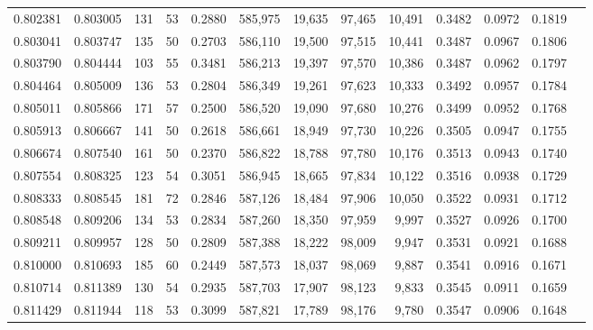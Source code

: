 \begin{tabular}{rrrrrrrrrrrrr}
0.802381 & 0.803005 &    131 &    53 &                                     0.2880 & 585,975 &  19,635 &  97,465 &  10,491 & 0.3482 & 0.0972 & 0.1819 \\
0.803041 & 0.803747 &    135 &    50 &                                     0.2703 & 586,110 &  19,500 &  97,515 &  10,441 & 0.3487 & 0.0967 & 0.1806 \\
0.803790 & 0.804444 &    103 &    55 &                                     0.3481 & 586,213 &  19,397 &  97,570 &  10,386 & 0.3487 & 0.0962 & 0.1797 \\
0.804464 & 0.805009 &    136 &    53 &                                     0.2804 & 586,349 &  19,261 &  97,623 &  10,333 & 0.3492 & 0.0957 & 0.1784 \\
0.805011 & 0.805866 &    171 &    57 &                                     0.2500 & 586,520 &  19,090 &  97,680 &  10,276 & 0.3499 & 0.0952 & 0.1768 \\
0.805913 & 0.806667 &    141 &    50 &                                     0.2618 & 586,661 &  18,949 &  97,730 &  10,226 & 0.3505 & 0.0947 & 0.1755 \\
0.806674 & 0.807540 &    161 &    50 &                                     0.2370 & 586,822 &  18,788 &  97,780 &  10,176 & 0.3513 & 0.0943 & 0.1740 \\
0.807554 & 0.808325 &    123 &    54 &                                     0.3051 & 586,945 &  18,665 &  97,834 &  10,122 & 0.3516 & 0.0938 & 0.1729 \\
0.808333 & 0.808545 &    181 &    72 &                                     0.2846 & 587,126 &  18,484 &  97,906 &  10,050 & 0.3522 & 0.0931 & 0.1712 \\
0.808548 & 0.809206 &    134 &    53 &                                     0.2834 & 587,260 &  18,350 &  97,959 &   9,997 & 0.3527 & 0.0926 & 0.1700 \\
0.809211 & 0.809957 &    128 &    50 &                                     0.2809 & 587,388 &  18,222 &  98,009 &   9,947 & 0.3531 & 0.0921 & 0.1688 \\
0.810000 & 0.810693 &    185 &    60 &                                     0.2449 & 587,573 &  18,037 &  98,069 &   9,887 & 0.3541 & 0.0916 & 0.1671 \\
0.810714 & 0.811389 &    130 &    54 &                                     0.2935 & 587,703 &  17,907 &  98,123 &   9,833 & 0.3545 & 0.0911 & 0.1659 \\
0.811429 & 0.811944 &    118 &    53 &                                     0.3099 & 587,821 &  17,789 &  98,176 &   9,780 & 0.3547 & 0.0906 & 0.1648 \\

\end{tabular}
